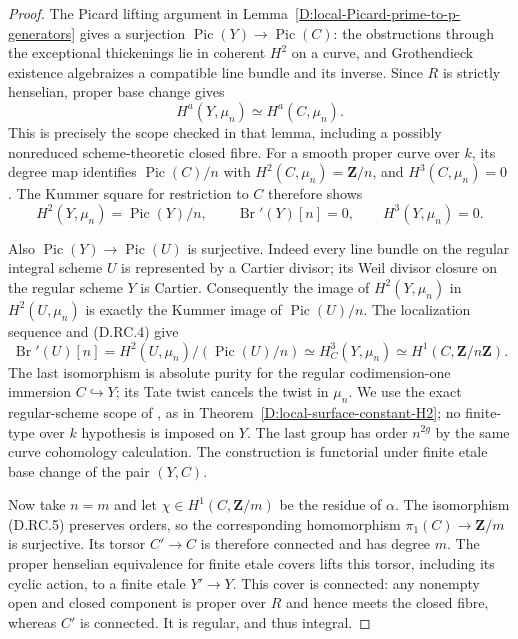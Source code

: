 \begin{proof}
The Picard lifting argument in
Lemma~\ref{D:local-Picard-prime-to-p-generators} gives a
surjection $\operatorname{Pic}(Y)\to\operatorname{Pic}(C)$:
the obstructions through the exceptional thickenings lie
in coherent $H^2$ on a curve, and Grothendieck existence
algebraizes a compatible line bundle and its inverse.
Since $R$ is strictly henselian, proper base change gives
\[
           H^a(Y,\mu_n)\simeq H^a(C,\mu_n).
                                                        \tag{D.RC.3}
\]
This is precisely the scope checked in that lemma, including
a possibly nonreduced scheme-theoretic closed fibre.
For a smooth proper curve over $k$, its degree map identifies
$\operatorname{Pic}(C)/n$ with $H^2(C,\mu_n)=\mathbf Z/n$,
and $H^3(C,\mu_n)=0$
\citep[Lemma~59.69.1 and complete proof, Tag 03RQ]
{StacksSingleCurveBrauerD}.
The Kummer square for restriction to $C$ therefore shows
\[
       H^2(Y,\mu_n)=\operatorname{Pic}(Y)/n,
       \qquad \operatorname{Br}'(Y)[n]=0,
       \qquad H^3(Y,\mu_n)=0.                         \tag{D.RC.4}
\]

Also $\operatorname{Pic}(Y)\to\operatorname{Pic}(U)$ is
surjective.  Indeed every line bundle on the regular integral
scheme $U$ is represented by a Cartier divisor; its Weil
divisor closure on the regular scheme $Y$ is Cartier.
Consequently the image of $H^2(Y,\mu_n)$ in $H^2(U,\mu_n)$
is exactly the Kummer image of $\operatorname{Pic}(U)/n$.
The localization sequence and (D.RC.4) give
\[
 \operatorname{Br}'(U)[n]
  =H^2(U,\mu_n)/(\operatorname{Pic}(U)/n)
  \simeq H^3_C(Y,\mu_n)
  \simeq H^1(C,\mathbf Z/n\mathbf Z).                 \tag{D.RC.5}
\]
The last isomorphism is absolute purity for the regular
codimension-one immersion $C\hookrightarrow Y$; its Tate
twist cancels the twist in $\mu_n$.
We use the exact regular-scheme scope of
\citep[Expose~XVI, Theorem~3.1.1]{A_ILO2014}, as in
Theorem~\ref{D:local-surface-constant-H2}; no finite-type
over $k$ hypothesis is imposed on $Y$.
The last group has order $n^{2g}$ by the same curve
cohomology calculation.  The construction is functorial
under finite etale base change of the pair $(Y,C)$.

Now take $n=m$ and let $\chi\in H^1(C,\mathbf Z/m)$
be the residue of $\alpha$.  The isomorphism (D.RC.5)
preserves orders, so the corresponding homomorphism
$\pi_1(C)\to\mathbf Z/m$ is surjective.  Its torsor
$C'\to C$ is therefore connected and has degree $m$.
The proper henselian equivalence for finite etale covers
\citep[Lemma~58.9.1 and complete proof, Tag 0A48]
{StacksSingleCurveBrauerD}
lifts this torsor, including its cyclic action, to a finite
etale $Y'\to Y$.  This cover is connected: any nonempty
open and closed component is proper over $R$ and hence
meets the closed fibre, whereas $C'$ is connected.
It is regular, and thus integral.


\end{proof}
